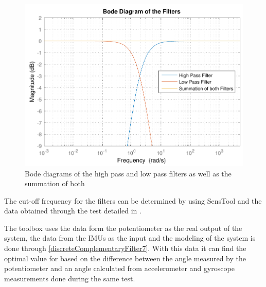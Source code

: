 %
\begin{figure}[H]
	\centering
	\includegraphics[scale=0.7]{figures/bodeFilters}
	\caption{Bode diagrams of the high pass and low pass filters as well as the summation of both}
	\label{bodeFilters}
\end{figure}\vspace{-5mm}
%
The cut-off frequency for the filters can be determined by using SensTool and the data obtained through the test detailed in . 

The toolbox uses the data form the potentiometer as the real output of the system, the data from the IMUs as the input and the modeling of the system is done through \eqref{discreteComplementaryFilter7}. With this data it can find the optimal value for \si{\tau} based on the difference between the angle measured by the potentiometer and an angle calculated from accelerometer and gyroscope measurements done during the same test.


